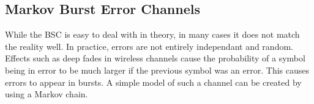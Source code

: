 \subsection{Markov Burst Error Channels}
While the BSC is easy to deal with in theory, in many cases it does not match the reality well. In practice, errors are not entirely independant and random. Effects such as deep fades in wireless channels cause the probability of a symbol being in error to be much larger if the previous symbol was an error. This causes errors to appear in bursts. A simple model of such a channel can be created by using a Markov chain.  
